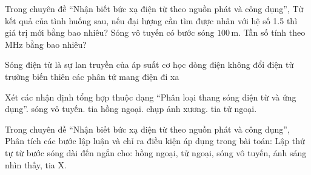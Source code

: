 \begin{ex}
Trong chuyên đề “Nhận biết bức xạ điện từ theo nguồn phát và công dụng”, Từ kết quả của tình huống sau, nếu đại lượng cần tìm được nhân với hệ số 1.5 thì giá trị mới bằng bao nhiêu? Sóng vô tuyến có bước sóng $100\,\text{m}$. Tần số tính theo MHz bằng bao nhiêu?
\end{ex}

\begin{ex}
Sóng điện từ là sự lan truyền của
\choice
{áp suất cơ học}
{dòng điện không đổi}
{\True điện từ trường biến thiên}
{các phân tử mang điện đi xa}
\end{ex}

\begin{ex}
Xét các nhận định tổng hợp thuộc dạng “Phân loại thang sóng điện từ và ứng dụng”.
\choiceTF
{\True sóng vô tuyến.}
{\True tia hồng ngoại.}
{\True chụp ảnh xương.}
{tia tử ngoại.}
\end{ex}

\begin{ex}
Trong chuyên đề “Nhận biết bức xạ điện từ theo nguồn phát và công dụng”, Phân tích các bước lập luận và chỉ ra điều kiện áp dụng trong bài toán: Lập thứ tự từ bước sóng dài đến ngắn cho: hồng ngoại, tử ngoại, sóng vô tuyến, ánh sáng nhìn thấy, tia X.
\choiceTF

\end{ex}

